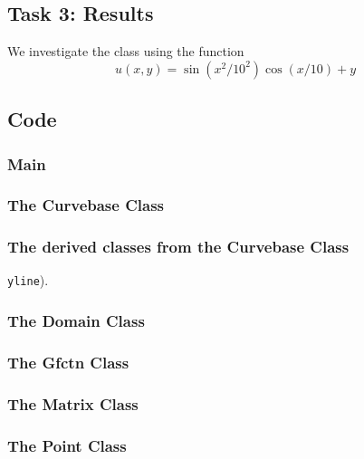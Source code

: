 \documentclass[a4paper,10pt]{article}
\begin{document}
\subsection*{Task 3: Results}
We investigate the class using the function
\begin{equation*}
  u(x,y) = \sin (x^2/10^2) \cos (x/10) + y
\end{equation*}


\newpage
\subsection*{Code}
\subsubsection*{Main}

\subsubsection*{The Curvebase Class}


\subsubsection*{The derived classes from the Curvebase Class}
\texttt{yline}).

%

%


\subsubsection*{The Domain Class}



\subsubsection*{The Gfctn Class}



\subsubsection*{The Matrix Class}



\subsubsection*{The Point Class}


\end{document}
